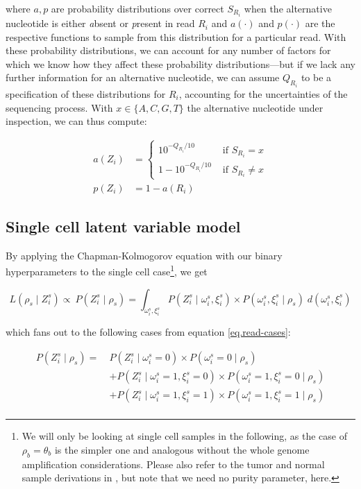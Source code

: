 \documentclass[authoryear,preprint,11pt]{scrartcl}
\newcommand{\Prob}{{P}}
\begin{document}
where $a,p$ are probability distributions over correct $S_{R_i}$ when the alternative nucleotide is either \emph{a}bsent or \emph{p}resent in read $R_i$ and $a(\cdot)$ and $p(\cdot)$ are the respective functions to sample from this distribution for a particular read.
With these probability distributions, we can account for any number of factors for which we know how they affect these probability distributions---but if we lack any further information for an alternative nucleotide, we can assume $Q_{R_i}$ to be a specification of these distributions for $R_i$, accounting for the uncertainties of the sequencing process.
With ${x \in \{A,C,G,T\}}$ the alternative nucleotide under inspection, we can thus compute:

\begin{align}
 a(Z_i) & =
 \label{eq:absent-phred}
 \begin{cases}
  10^{-Q_{R_i}/10}     & \text{ if } S_{R_i} = x    \\
  1 - 10^{-Q_{R_i}/10} & \text{ if } S_{R_i} \neq x
 \end{cases} \\
 p(Z_i) & = 1 - a(R_i)
 \label{eq:present-phred}
\end{align}

\subsection{Single cell latent variable model} \label{sec:sc-model}

By applying the Chapman-Kolmogorov equation with our binary hyperparameters to the single cell case\footnote{
 We will only be looking at single cell samples in the following, as the case of $\rho_b = \theta_b$ is the simpler one and analogous without the whole genome amplification considerations. Please also refer to the tumor and normal sample derivations in \cite{koster_varlociraptor_2020}, but note that we need no purity parameter, here.
}, we get

\begin{equation}
 L(\rho_s \mid Z_i^s) \propto~ \Prob(Z_i^s \mid \rho_s)= \int_{\omega_i^s,\xi_i^s}\Prob(Z_i^s \mid \omega_i^s,\xi_i^s)\times \Prob(\omega_i^s,\xi_i^s \mid \rho_s)\;d(\omega_i^s,\xi_i^s)
\end{equation}

which fans out to the following cases from equation \ref{eq.read-cases}:

\begin{equation}
 \begin{split}
  \Prob(Z_i^s \mid \rho_s) =~ &\Prob(Z_i^s \mid \omega_i^s=0) \times \Prob(\omega_i^s=0 \mid \rho_s) \\
  &+ \Prob(Z_i^s \mid \omega_i^s=1,\xi_i^s=0) \times \Prob(\omega_i^s=1,\xi_i^s=0 \mid \rho_s) \\
  &+ \Prob(Z_i^s \mid \omega_i^s=1,\xi_i^s=1) \times \Prob(\omega_i^s=1,\xi_i^s=1 \mid \rho_s) \\
 \end{split}
\end{equation}
\end{document}
